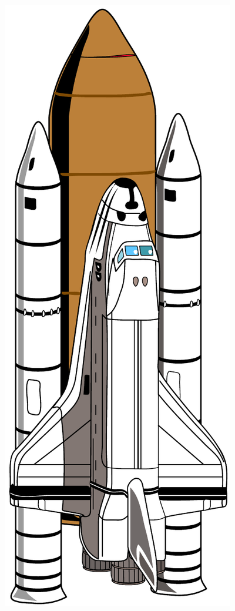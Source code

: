 \begin{frame}
\begin{columns}
\begin{figure}
      \includegraphics[scale=0.13]{images/shuttle.pdf}
      \centering
    \end{figure}
  \end{columns}
\end{frame}

